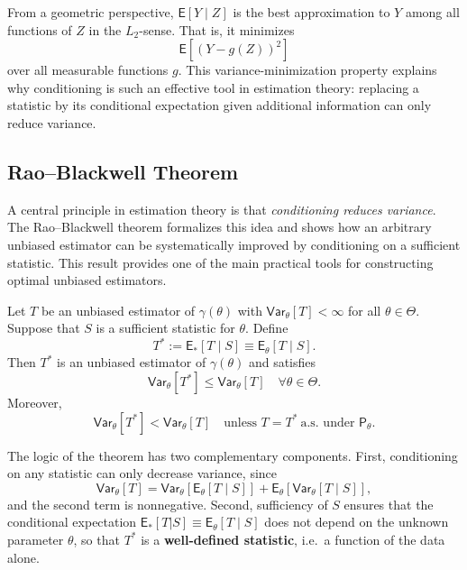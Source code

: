 From a geometric perspective, \(\mathsf{E}[Y \mid Z]\) is the best approximation to
\(Y\) among all functions of \(Z\) in the \(L_{2}\)-sense.
That is, it minimizes
\[
    \mathsf{E}\!\left[(Y - g(Z))^2\right]
\]
over all measurable functions \(g\).
This variance-minimization property explains why conditioning is such an effective
tool in estimation theory: replacing a statistic by its conditional expectation
given additional information can only reduce variance.

\subsection{Rao--Blackwell Theorem}%
\label{sub:rb}

A central principle in estimation theory is that \emph{conditioning reduces variance}.
The Rao--Blackwell theorem formalizes this idea and shows how an arbitrary unbiased
estimator can be systematically improved by conditioning on a sufficient statistic.
This result provides one of the main practical tools for constructing optimal
unbiased estimators.

\begin{theo}
\label{theo:rb}
Let \(T\) be an unbiased estimator of \(\gamma(\theta)\) with
\(\mathsf{Var}_{\theta}[T] < \infty\) for all \(\theta \in \Theta\).
Suppose that \(S\) is a sufficient statistic for \(\theta\).
Define
\[
    T^{*}
    :=
    \mathsf{E}_{*}[T \mid S]
    \equiv
    \mathsf{E}_{\theta}[T \mid S].
\]
Then \(T^{*}\) is an unbiased estimator of \(\gamma(\theta)\) and satisfies
\[
    \mathsf{Var}_{\theta}[T^{*}]
    \le
    \mathsf{Var}_{\theta}[T]
    \quad
    \forall \theta \in \Theta.
\]
Moreover,
\[
    \mathsf{Var}_{\theta}[T^{*}]
    <
    \mathsf{Var}_{\theta}[T]
    \quad
    \text{unless }
    T = T^{*} \ \text{a.s. under } \mathsf{P}_{\theta}.
\]
\end{theo}
\medskip
\begin{remark}[]
    
The logic of the theorem has two complementary components.
First, conditioning on any statistic can only decrease variance, since
\[
    \mathsf{Var}_{\theta}[T]
    =
    \mathsf{Var}_{\theta}[\mathsf{E}_{\theta}[T \mid S]]
    +
    \mathsf{E}_{\theta}[\mathsf{Var}_{\theta}[T \mid S]],
\]
and the second term is nonnegative.
Second, sufficiency of \(S\) ensures that the conditional expectation
\(\mathsf{E}_{*}\left[T|S\right] \equiv \mathsf{E}_{\theta}[T \mid S]\) does not depend on the unknown parameter
\(\theta\), so that \(T^{*}\) is a \textbf{ well-defined statistic}, i.e.\ a function of the data alone.
\end{remark}

